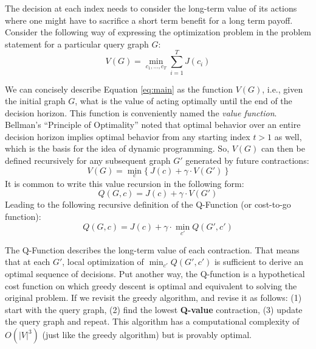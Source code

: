 The decision at each index needs to consider the long-term value of its actions where one might have to sacrifice a short term benefit for a long term payoff.
Consider the following way of expressing the optimization problem in the problem statement for a particular query graph $G$:
\begin{equation}
V(G) = \min_{c_1,...,c_T} \sum_{i=1}^T J(c_i)
\label{eq:main}
\end{equation}

We can concisely describe Equation \ref{eq:main} as the function $V(G)$,  i.e., given the initial graph $G$, what is the value of acting optimally until the end of the decision horizon. This function is conveniently named the \emph{value function}. Bellman's ``Principle of Optimality'' noted that optimal behavior over an entire decision horizon implies optimal behavior from any starting index $t>1$ as well, which is the basis for the idea of dynamic programming.
So, $V(G)$ can then be defined recursively for any subsequent graph $G'$ generated by future contractions:
\begin{equation}
V(G) = \min_{c}\{~J(c) + \gamma \cdot V(G') ~\}
\label{eq:value}
\end{equation}
It is common to write this value recursion in the following form:
\[
Q(G,c) = J(c) + \gamma \cdot V(G')
\]
Leading to the following recursive definition of the Q-Function (or cost-to-go function):
\begin{equation}
Q(G,c) = J(c) + \gamma \cdot \min_{c'} Q( G',c')
\label{eq:q}
\end{equation}

The Q-Function describes the long-term value of each contraction. 
That means that at each $G'$, local optimization of $\min_{c'} Q(G',c')$ is sufficient to derive an optimal sequence of decisions. Put another way, the Q-function is a hypothetical cost function on which greedy descent is optimal and equivalent to solving the original problem.
If we revisit the greedy algorithm, and revise it as follows: (1) start with the query graph, (2) find the lowest \textbf{Q-value} contraction, (3) update the query graph and repeat. This algorithm has a computational complexity of $O(|V|^3)$ (just like the greedy algorithm) but is provably optimal. 


